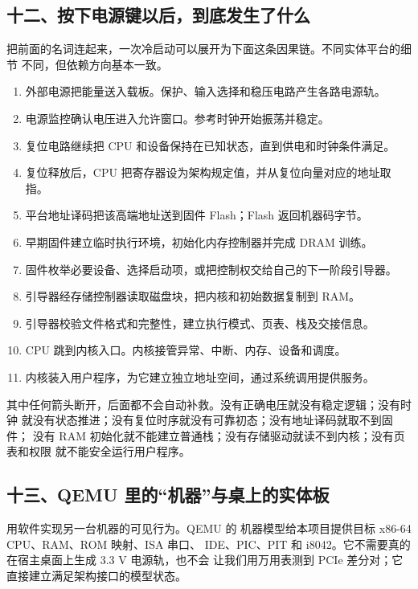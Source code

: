 \subsection{十二、按下电源键以后，到底发生了什么}

把前面的名词连起来，一次冷启动可以展开为下面这条因果链。不同实体平台的细节
不同，但依赖方向基本一致。

\begin{enumerate}[leftmargin=2em]
  \item 外部电源把能量送入载板。保护、输入选择和稳压电路产生各路电源轨。
  \item 电源监控确认电压进入允许窗口。参考时钟开始振荡并稳定。
  \item 复位电路继续把 CPU 和设备保持在已知状态，直到供电和时钟条件满足。
  \item 复位释放后，CPU 把寄存器设为架构规定值，并从复位向量对应的地址取指。
  \item 平台地址译码把该高端地址送到固件 Flash；Flash 返回机器码字节。
  \item 早期固件建立临时执行环境，初始化内存控制器并完成 DRAM 训练。
  \item 固件枚举必要设备、选择启动项，或把控制权交给自己的下一阶段引导器。
  \item 引导器经存储控制器读取磁盘块，把内核和初始数据复制到 RAM。
  \item 引导器校验文件格式和完整性，建立执行模式、页表、栈及交接信息。
  \item CPU 跳到内核入口。内核接管异常、中断、内存、设备和调度。
  \item 内核装入用户程序，为它建立独立地址空间，通过系统调用提供服务。
\end{enumerate}

其中任何箭头断开，后面都不会自动补救。没有正确电压就没有稳定逻辑；没有时钟
就没有状态推进；没有复位时序就没有可靠初态；没有地址译码就取不到固件；
没有 RAM 初始化就不能建立普通栈；没有存储驱动就读不到内核；没有页表和权限
就不能安全运行用户程序。

\subsection{十三、QEMU 里的“机器”与桌上的实体板}

用软件实现另一台机器的可见行为。QEMU 的
 机器模型给本项目提供目标 x86-64 CPU、RAM、ROM 映射、ISA 串口、
IDE、PIC、PIT 和 i8042。它不需要真的在宿主桌面上生成 3.3 V 电源轨，也不会
让我们用万用表测到 PCIe 差分对；它直接建立满足架构接口的模型状态。

